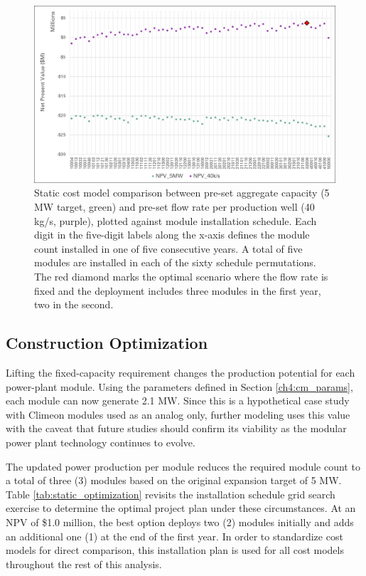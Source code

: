 \begin{figure}[!htp]
\centering
\includegraphics[width=.98\textwidth]
{templates/images/Figure-Static_Model_Construction.png}
\caption[Static cost-model comparison]{Static cost model comparison between pre-set aggregate capacity (5 MW target, green) and pre-set flow rate per production well (40 kg/s, purple), plotted against module installation schedule. Each digit in the five-digit labels along the x-axis defines the module count installed in one of five consecutive years. A total of five modules are installed in each of the sixty schedule permutations. The red diamond marks the optimal scenario where the flow rate is fixed and the deployment includes three modules in the first year, two in the second.}
\label{fig:static_model_compare}
\end{figure}

\subsection{Construction Optimization}\label{ch6:static_schedule}

Lifting the fixed-capacity requirement changes the production potential for each power-plant module. Using the parameters defined in Section \ref{ch4:cm_params}, each module can now generate 2.1 MW. Since this is a hypothetical case study with Climeon modules used as an analog only, further modeling uses this value with the caveat that future studies should confirm its viability as the modular power plant technology continues to evolve.

The updated power production per module reduces the required module count to a total of three (3) modules based on the original expansion target of 5 MW. Table \ref{tab:static_optimization} revisits the installation schedule grid search exercise to determine the optimal project plan under these circumstances. At an NPV of \$1.0 million, the best option deploys two (2) modules initially and adds an additional one (1) at the end of the first year. In order to standardize cost models for direct comparison, this installation plan is used for all cost models throughout the rest of this analysis.

